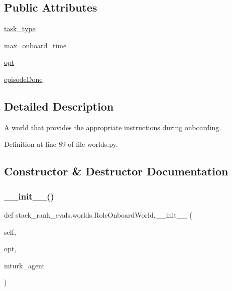 \subsection*{Public Attributes}
\begin{DoxyCompactItemize}
\item 
\hyperlink{classstack__rank__evals_1_1worlds_1_1RoleOnboardWorld_af8109c2ced237355a055ad67e7436a65}{task\+\_\+type}
\item 
\hyperlink{classstack__rank__evals_1_1worlds_1_1RoleOnboardWorld_a66d9e43741be6eee3262e5ffc47fb147}{max\+\_\+onboard\+\_\+time}
\item 
\hyperlink{classstack__rank__evals_1_1worlds_1_1RoleOnboardWorld_a986c8464db53b9d32da815609b44392d}{opt}
\item 
\hyperlink{classstack__rank__evals_1_1worlds_1_1RoleOnboardWorld_a80faeeeacacbf4babca6b7a66d6716bd}{episode\+Done}
\end{DoxyCompactItemize}


\subsection{Detailed Description}
\begin{DoxyVerb}A world that provides the appropriate instructions during onboarding.
\end{DoxyVerb}
 

Definition at line 89 of file worlds.\+py.



\subsection{Constructor \& Destructor Documentation}
\mbox{\label{classstack__rank__evals_1_1worlds_1_1RoleOnboardWorld_a93c85daae3056c33bc77b6159ce43b57}} 
\subsubsection{\texorpdfstring{\+\_\+\+\_\+init\+\_\+\+\_\+()}{\_\_init\_\_()}\hspace{0.1cm}{\footnotesize\ttfamily [1/2]}}
{\footnotesize\ttfamily def stack\+\_\+rank\+\_\+evals.\+worlds.\+Role\+Onboard\+World.\+\_\+\+\_\+init\+\_\+\+\_\+ (\begin{DoxyParamCaption}\item[{}]{self,  }\item[{}]{opt,  }\item[{}]{mturk\+\_\+agent }\end{DoxyParamCaption})}



